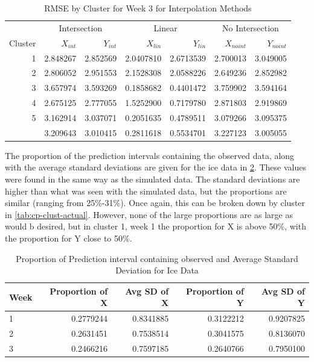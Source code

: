 \documentclass[12pt]{article}
\begin{document}
\begin{table}

\caption{\label{tab:results-clust3-actual}RMSE by Cluster for Week 3 for Interpolation Methods}
\centering
\begin{tabular}[t]{rrrrrrr}
\toprule
\multicolumn{1}{c}{ } & \multicolumn{2}{c}{Intersection} & \multicolumn{2}{c}{Linear} & \multicolumn{2}{c}{No Intersection} \\
\cmidrule(l{3pt}r{3pt}){2-3} \cmidrule(l{3pt}r{3pt}){4-5} \cmidrule(l{3pt}r{3pt}){6-7}
Cluster & $X_{int}$ & $Y_{int}$ & $X_{lin}$ & $Y_{lin}$ & $X_{noint}$ & $Y_{noint}$\\
\midrule
1 & 2.848267 & 2.852569 & 2.0407810 & 2.6713539 & 2.700013 & 3.049005\\
2 & 2.806052 & 2.951553 & 2.1528308 & 2.0588226 & 2.649236 & 2.852982\\
3 & 3.657974 & 3.593269 & 0.1858682 & 0.4401472 & 3.759902 & 3.594164\\
4 & 2.675125 & 2.777055 & 1.5252900 & 0.7179780 & 2.871803 & 2.919869\\
5 & 3.162914 & 3.037071 & 0.2051635 & 0.4789511 & 3.079266 & 3.095375\\
\addlinespace
6 & 3.209643 & 3.010415 & 0.2811618 & 0.5534701 & 3.227123 & 3.005055\\
\bottomrule
\end{tabular}
\end{table}

The proportion of the prediction intervals containing the observed data,
along with the average standard deviations are given for the ice data in
\cref{tab:cp-table}. These values were found in the same way as the
simulated data. The standard deviations are higher than what was seen
with the simulated data, but the proportions are similar (ranging from
25\%-31\%). Once again, this can be broken down by cluster in
\cref{tab:cp-clust-actual}. However, none of the large proportions are
as large as would b desired, but in cluster 1, week 1 the proportion for
X is above 50\%, with the proportion for Y close to 50\%.

\begin{table}

\caption{\label{tab:cp-table}Proportion of Prediction interval containing observed and Average Standard Deviation for Ice Data}
\centering
\begin{tabular}[t]{lrrrr}
\toprule
Week & Proportion of X & Avg SD of X & Proportion of Y & Avg SD of Y\\
\midrule
1 & 0.2779244 & 0.8341885 & 0.3122212 & 0.9207825\\
2 & 0.2631451 & 0.7538514 & 0.3041575 & 0.8136070\\
3 & 0.2466216 & 0.7597185 & 0.2640766 & 0.7950100\\
\bottomrule
\end{tabular}
\end{table}
\end{document}
